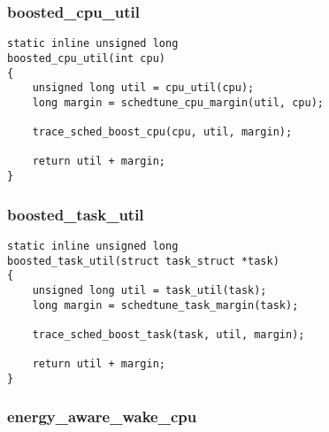 \documentclass{article}
\begin{document}
\subsubsection{boosted\_cpu\_util}

\begin{verbatim}
static inline unsigned long
boosted_cpu_util(int cpu)
{
    unsigned long util = cpu_util(cpu);
    long margin = schedtune_cpu_margin(util, cpu);

    trace_sched_boost_cpu(cpu, util, margin);

    return util + margin;
}
\end{verbatim}

\subsubsection{boosted\_task\_util}

\begin{verbatim}
static inline unsigned long
boosted_task_util(struct task_struct *task)
{
    unsigned long util = task_util(task);
    long margin = schedtune_task_margin(task);

    trace_sched_boost_task(task, util, margin);

    return util + margin;
}
\end{verbatim}

\subsubsection{energy\_aware\_wake\_cpu}
\end{document}
